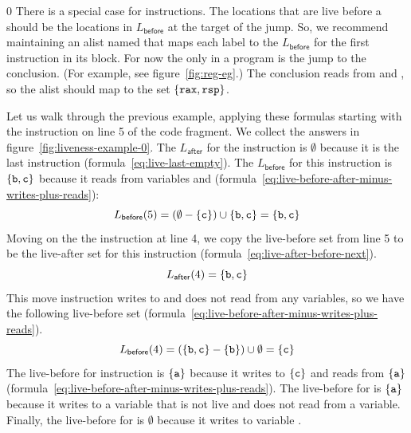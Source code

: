 \documentclass[7x10]{TimesAPriori_MIT}%
\def\racketEd{0}
\def\edition{1}
\numberwithin{theorem}{chapter}
\numberwithin{definition}{chapter}
\numberwithin{equation}{chapter}
\begin{document}
{\if\edition\racketEd
%
There is a special case for  instructions.  The locations
that are live before a  should be the locations in
$L_{\mathsf{before}}$ at the target of the jump. So, we recommend
maintaining an alist named  that maps each label to
the $L_{\mathsf{before}}$ for the first instruction in its block. For
now the only  in a \LangXVar{} program is the jump to the
conclusion. (For example, see figure~\ref{fig:reg-eg}.)  The
conclusion reads from  and , so the alist should map
 to the set $\{\text{\texttt{rax}},\text{\texttt{rsp}}\}$.
%
\fi}

Let us walk through the previous example, applying these formulas
starting with the instruction on line 5 of the code fragment. We
collect the answers in figure~\ref{fig:liveness-example-0}.  The
$L_{\mathsf{after}}$ for the  instruction is
$\emptyset$ because it is the last instruction
(formula~\eqref{eq:live-last-empty}).  The $L_{\mathsf{before}}$ for
this instruction is $\{\text{\texttt{b}},\text{\texttt{c}}\}$ because it reads from
variables  and 
(formula~\eqref{eq:live-before-after-minus-writes-plus-reads}):
\[
   L_{\mathsf{before}}(5) = (\emptyset - \{\text{\texttt{c}}\}) \cup \{ \text{\texttt{b}}, \text{\texttt{c}} \} = \{ \text{\texttt{b}}, \text{\texttt{c}} \}
\]
Moving on the the instruction  at line 4, we copy
the live-before set from line 5 to be the live-after set for this
instruction (formula~\eqref{eq:live-after-before-next}).
\[
  L_{\mathsf{after}}(4) = \{ \text{\texttt{b}}, \text{\texttt{c}} \}
\]
This move instruction writes to  and does not read from any
variables, so we have the following live-before set
(formula~\eqref{eq:live-before-after-minus-writes-plus-reads}).
\[
  L_{\mathsf{before}}(4) = (\{\text{\texttt{b}},\text{\texttt{c}}\} - \{\text{\texttt{b}}\}) \cup \emptyset = \{ \text{\texttt{c}} \}
\]
The live-before for instruction 
is $\{\text{\texttt{a}}\}$ because it writes to $\{\text{\texttt{c}}\}$ and reads from $\{\text{\texttt{a}}\}$
(formula~\eqref{eq:live-before-after-minus-writes-plus-reads}).  The
live-before for  is $\{\text{\texttt{a}}\}$ because it writes to a
variable that is not live and does not read from a variable.
Finally, the live-before for  is $\emptyset$
because it writes to variable .
\end{document}
